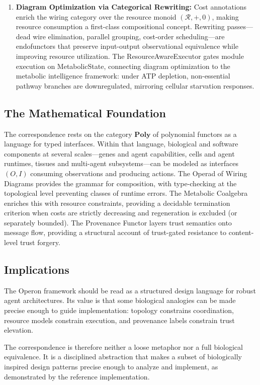 \begin{enumerate}[leftmargin=*]
\item \textbf{Diagram Optimization via Categorical Rewriting:} Cost annotations enrich the wiring category
over the resource monoid $(\mathcal{R}, +, 0)$, making resource consumption a first-class compositional concept.
Rewriting passes---dead wire elimination, parallel grouping, cost-order scheduling---are endofunctors
that preserve input-output observational equivalence while improving resource utilization. The ResourceAwareExecutor
gates module execution on MetabolicState, connecting diagram optimization to the metabolic intelligence
framework: under ATP depletion, non-essential pathway branches are downregulated, mirroring cellular
starvation responses.
\end{enumerate}

\subsection*{The Mathematical Foundation}

The correspondence rests on the category $\mathbf{Poly}$ of polynomial functors as a language for typed
interfaces. Within that language, biological and software components at several scales---genes and agent
capabilities, cells and agent runtimes, tissues and multi-agent subsystems---can be modeled as interfaces
$(O, I)$ consuming observations and producing actions. The Operad of Wiring Diagrams
provides the grammar for composition, with type-checking at the topological level preventing classes of
runtime errors. The Metabolic Coalgebra enriches this with resource constraints, providing a decidable
termination criterion when costs are strictly decreasing and regeneration is excluded (or separately bounded).
The Provenance Functor layers trust semantics onto message flow, providing a structural account of
trust-gated resistance to content-level trust forgery.

\subsection*{Implications}

The Operon framework should be read as a structured design language for robust agent architectures. Its
value is that some biological analogies can be made precise enough to guide implementation: topology
constrains coordination, resource models constrain execution, and provenance labels constrain trust
elevation.

The correspondence is therefore neither a loose metaphor nor a full biological equivalence. It is a
disciplined abstraction that makes a subset of biologically inspired design patterns precise enough to
analyze and implement, as demonstrated by the reference implementation.

